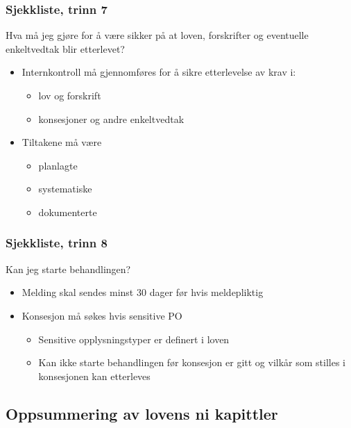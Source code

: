 \documentclass[11pt]{article}
\begin{document}
\subsubsection{Sjekkliste, trinn 7}
\label{sec-17.1.7}

    Hva må jeg gjøre for å være sikker på at loven, forskrifter og eventuelle enkeltvedtak blir etterlevet?
\begin{itemize}
\item Internkontroll må gjennomføres for å sikre etterlevelse av krav i:

\begin{itemize}
\item lov og forskrift
\item konsesjoner og andre enkeltvedtak
\end{itemize}

\item Tiltakene må være

\begin{itemize}
\item planlagte
\item systematiske
\item dokumenterte
\end{itemize}

\end{itemize}
\subsubsection{Sjekkliste, trinn 8}
\label{sec-17.1.8}

    Kan jeg starte behandlingen?
\begin{itemize}
\item Melding skal sendes minst 30 dager før hvis meldepliktig
\item Konsesjon må søkes hvis sensitive PO

\begin{itemize}
\item Sensitive opplysningstyper er definert i loven
\item Kan ikke starte behandlingen før konsesjon er gitt og vilkår
        som stilles i konsesjonen kan etterleves
\end{itemize}

\end{itemize}
\subsection{Oppsummering av lovens ni kapittler}
\label{sec-17.2}
\end{document}
